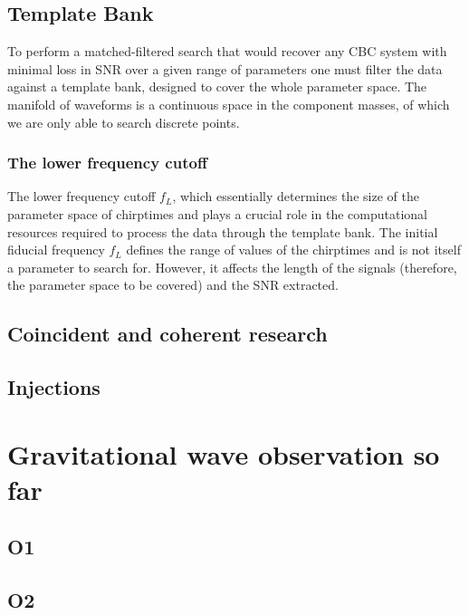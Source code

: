 \documentclass[binding=0.6cm, LaM]{sapthesis}
\begin{document}
\section{Template Bank}


	To perform a matched-filtered search that would recover any CBC system 	
	with minimal loss in SNR over a given range of parameters 
	one must filter the data against a template bank, 
	designed to cover the whole parameter space.
	The manifold of waveforms is a continuous space in the component masses, 
	of which we are only able to search discrete points. 
\subsection{The lower frequency cutoff}

	The lower frequency cutoff $f_L$, which essentially determines the size of the parameter space 
	of chirptimes and plays a crucial role in the computational resources required 
	to process the data through the template bank. 
	The initial fiducial frequency $f_L$ defines the range of values of the chirptimes 
	and is not itself a parameter to search for. 
	However, it affects the length of the signals 
	(therefore, the parameter space to be covered) and the SNR extracted. 

\section{Coincident and coherent research}

\section{Injections}

\cite[p. 2] {bar}
\chapter{Gravitational wave observation so far}

\section{O1}

\section{O2}
\end{document}
